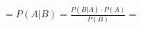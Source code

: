 \documentclass[preview]{standalone}
\begin{document}
\begin{align*}
= P(A|B) = \frac{P(B|A) \cdot P(A)}{P(B)} =
\end{align*}
\end{document}
